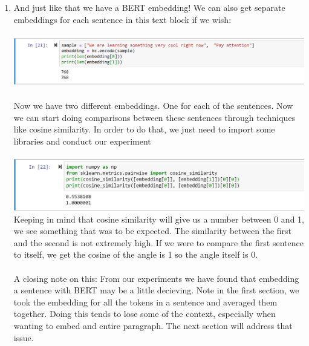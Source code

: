 \documentclass{article}
\begin{document}
\begin{enumerate}
\begin{enumerate}
    \item[] And just like that we have a BERT embedding! We can also get separate embeddings for each sentence in this text block if we wish:\\
    \vspace{.1cm}\\
    \includegraphics[scale = .7]{sample_list.png}\\
    \vspace{.1cm}\\
    Now we have two different embeddings. One for each of the sentences. Now we can start doing comparisons between these sentences through techniques like cosine similarity. In order to do that, we just need to import some libraries and conduct our experiment\\
    \vspace{.1cm}\\
    \includegraphics[scale = .775]{cosine_sim.png}
    \vspace{.1cm}\\
    Keeping in mind that cosine similarity will give us a number between 0 and 1, we see something that was to be expected. The similarity between the first and the second is not extremely high.  If we were to compare the first sentence to itself, we get the cosine of the angle is 1 so the angle itself is 0.\\
    \vspace{.2cm}\\
    A closing note on this: From our experiments we have found that embedding a sentence with BERT may be a little decieving.  Note in the first section, we took the embedding for all the tokens in a sentence and averaged them together.  Doing this tends to lose some of the context, especially when wanting to embed and entire paragraph.  The next section will address that issue.
    \end{enumerate}
    
    
\end{enumerate}
\end{document}
